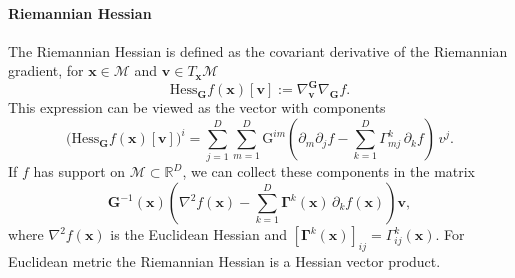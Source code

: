 \paragraph{Riemannian Hessian} 
The Riemannian Hessian is defined as the covariant derivative of the Riemannian gradient, for $\boldsymbol{x}\in\mathcal{M}$ and $\boldsymbol{v}\in T_{\boldsymbol{x}}\mathcal{M}$
\begin{equation*}
\mathrm{Hess}_{\mathbf{G}} f(\boldsymbol{x})[\boldsymbol{v}]
:=
\nabla^{\mathbf{G}}_{\boldsymbol{v}} \nabla_{\mathbf{G}} f.
\end{equation*}
This expression can be viewed as the vector with components
\begin{equation*}
\bigl(\mathrm{Hess}_{\mathbf{G}} f(\boldsymbol{x})[\boldsymbol{v}]\bigr)^i
=
\sum_{j=1}^D 
\sum_{m=1}^D \mathrm{G}^{im}\left(\partial_m\partial_j f
-
\sum_{k=1}^D \Gamma^k_{mj}\,\partial_k f\right)
\, v^j.
\end{equation*}
If $f$ has support on $\mathcal{M}\subset\mathbb{R}^D$, we can collect these components in the matrix
\begin{equation}
\mathbf{G}^{-1}(\boldsymbol{x})\left(\nabla^2 f(\boldsymbol{x})
- \sum_{k=1}^D \mathbf{\Gamma}^k(\boldsymbol{x})\,\partial_k f(\boldsymbol{x})\right)\boldsymbol{v},
\label{eq:riem_hessian}
\end{equation}
where $\nabla^2 f(\boldsymbol{x})$ is the Euclidean Hessian and $[\mathbf{\Gamma}^k(\boldsymbol{x})]_{ij} = {\Gamma}_{ij}^k(\boldsymbol{x})$. For Euclidean metric the Riemannian Hessian is a Hessian vector product. 


